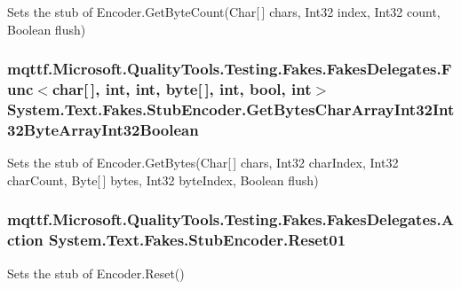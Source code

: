 Sets the stub of Encoder.\-Get\-Byte\-Count(\-Char\mbox{[}$\,$\mbox{]} chars, Int32 index, Int32 count, Boolean flush)

\hypertarget{class_system_1_1_text_1_1_fakes_1_1_stub_encoder_a14c09076337c98725d3497f5f7315378}{
\subsubsection[{Get\-Bytes\-Char\-Array\-Int32\-Int32\-Byte\-Array\-Int32\-Boolean}]{\setlength{\rightskip}{0pt plus 5cm}mqttf.\-Microsoft.\-Quality\-Tools.\-Testing.\-Fakes.\-Fakes\-Delegates.\-Func$<$char\mbox{[}$\,$\mbox{]}, int, int, byte\mbox{[}$\,$\mbox{]}, int, bool, int$>$ System.\-Text.\-Fakes.\-Stub\-Encoder.\-Get\-Bytes\-Char\-Array\-Int32\-Int32\-Byte\-Array\-Int32\-Boolean}}\label{class_system_1_1_text_1_1_fakes_1_1_stub_encoder_a14c09076337c98725d3497f5f7315378}


Sets the stub of Encoder.\-Get\-Bytes(\-Char\mbox{[}$\,$\mbox{]} chars, Int32 char\-Index, Int32 char\-Count, Byte\mbox{[}$\,$\mbox{]} bytes, Int32 byte\-Index, Boolean flush)

\hypertarget{class_system_1_1_text_1_1_fakes_1_1_stub_encoder_a854d016815a8224dd914db2200846525}{
\subsubsection[{Reset01}]{\setlength{\rightskip}{0pt plus 5cm}mqttf.\-Microsoft.\-Quality\-Tools.\-Testing.\-Fakes.\-Fakes\-Delegates.\-Action System.\-Text.\-Fakes.\-Stub\-Encoder.\-Reset01}}\label{class_system_1_1_text_1_1_fakes_1_1_stub_encoder_a854d016815a8224dd914db2200846525}


Sets the stub of Encoder.\-Reset()




